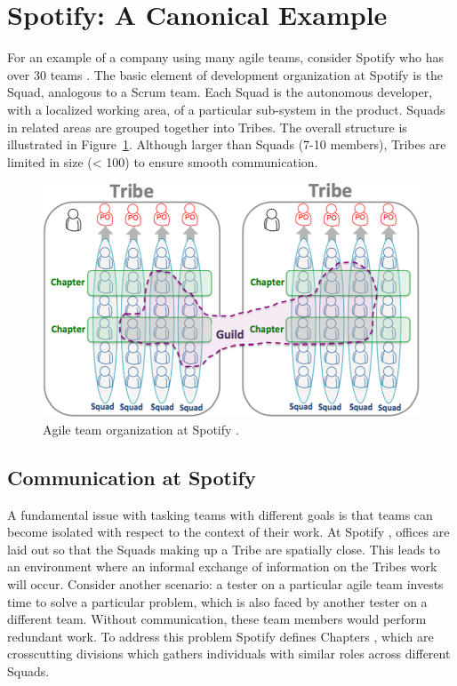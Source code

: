 ﻿\section{Spotify: A Canonical Example} 
\label{sec:spt_ex} 
For an example of a company using many agile teams, consider Spotify who has over 30 teams \cite{kniberg12}.
The basic element of development organization at Spotify is the Squad, analogous to a Scrum team.
Each Squad is the autonomous developer, with a localized working area, of a particular sub-system in the product.
Squads in related areas are grouped together into Tribes. 
The overall structure is illustrated in Figure~\ref{fig:spotify_structure}.
Although larger than Squads (7-10 members), Tribes are limited in size (< 100) to ensure smooth communication.

\begin{figure}[h]
  \includegraphics[width=\linewidth]{images/kniberg12_structure.png}
  \caption{Agile team organization at Spotify \cite{kniberg12}.}
  \label{fig:spotify_structure}
\end{figure}


\subsection{Communication at Spotify}
A fundamental issue with tasking teams with different goals is that teams can become isolated with respect to the context of their work.
At Spotify \cite{kniberg12}, offices are laid out so that the Squads making up a Tribe are spatially close. This leads to an environment where an informal exchange of information on the Tribes work will occur.
Consider another scenario: a tester on a particular agile team invests time to solve a particular problem, which is also faced by another tester on a different team. Without communication, these team members would perform redundant work.
To address this problem Spotify defines Chapters \cite{kniberg12}, which are crosscutting divisions which gathers individuals with similar roles across different Squads. 



